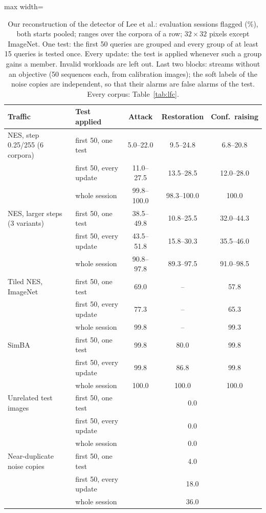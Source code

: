 \begin{table}[!tbp]
\centering\footnotesize\setlength{\tabcolsep}{5pt}
\caption{Our reconstruction of the detector of Lee et al.: evaluation sessions flagged (\%), both starts pooled; ranges over the corpora of a row; $32\times32$ pixels except ImageNet. One test: the first 50 queries are grouped and every group of at least 15 queries is tested once. Every update: the test is applied whenever such a group gains a member. Invalid workloads are left out. Last two blocks: streams without an objective (50 sequences each, from calibration images); the soft labels of the noise copies are independent, so that their alarms are false alarms of the test. Every corpus: Table~\ref{tab:lfc}.}
\label{tab:main-lfc}
\vspace{3pt}
\begin{adjustbox}{max width=\textwidth}
\begin{tabular}{llccc}
\toprule
Traffic & Test applied & Attack & Restoration & Conf.\ raising \\
\midrule
NES, step 0.25/255 (6 corpora) & first 50, one test & 5.0--22.0 & 9.5--24.8 & 6.8--20.8 \\
 & first 50, every update & 11.0--27.5 & 13.5--28.5 & 12.0--28.0 \\
 & whole session & 99.8--100.0 & 98.3--100.0 & 100.0 \\[2pt]
NES, larger steps (3 variants) & first 50, one test & 38.5--49.8 & 10.8--25.5 & 32.0--44.3 \\
 & first 50, every update & 43.5--51.8 & 15.8--30.3 & 35.5--46.0 \\
 & whole session & 90.8--97.8 & 89.3--97.5 & 91.0--98.5 \\[2pt]
Tiled NES, ImageNet & first 50, one test & 69.0 & -- & 57.8 \\
 & first 50, every update & 77.3 & -- & 65.3 \\
 & whole session & 99.8 & -- & 99.3 \\[2pt]
SimBA & first 50, one test & 99.8 & 80.0 & 99.8 \\
 & first 50, every update & 99.8 & 86.8 & 99.8 \\
 & whole session & 100.0 & 100.0 & 100.0 \\[2pt]
Unrelated test images & first 50, one test & \multicolumn{3}{c}{0.0} \\
 & first 50, every update & \multicolumn{3}{c}{0.0} \\
 & whole session & \multicolumn{3}{c}{0.0} \\[2pt]
Near-duplicate noise copies & first 50, one test & \multicolumn{3}{c}{4.0} \\
 & first 50, every update & \multicolumn{3}{c}{18.0} \\
 & whole session & \multicolumn{3}{c}{36.0} \\
\bottomrule
\end{tabular}
\end{adjustbox}
\end{table}
